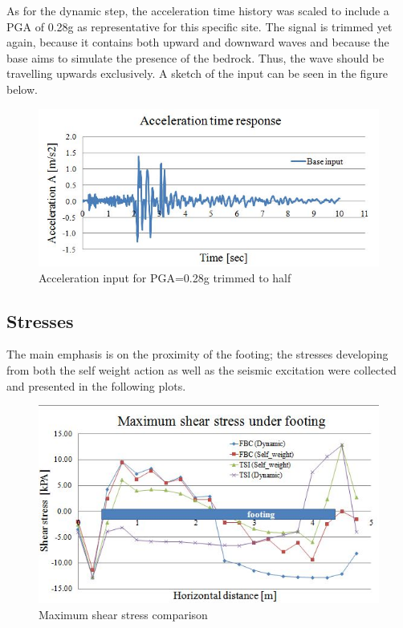 As for the dynamic step, the acceleration time history was scaled to include a PGA of 0.28g as representative for this specific site. The signal is trimmed yet again, because it contains both upward and downward waves and because the base aims to simulate the presence of the bedrock. Thus, the wave should be travelling upwards exclusively. A sketch of the input can be seen in the figure below.

		\begin{figure}[!h]
			\centering
			\includegraphics[width=0.9\linewidth]{"input_acc"}
			\caption{Acceleration input for PGA=0.28g trimmed to half}
			\label{inputacc}
		\end{figure}
		
\newpage
\subsection{Stresses}

The main emphasis is on the proximity of the footing; the stresses developing from both the self weight action as well as the seismic excitation were collected and presented in the following plots. 
\begin{figure}[!h]
	\centering
	\includegraphics[width=0.7\linewidth]{"shear stress"}
	\caption{Maximum shear stress comparison}
	\label{shearrr}
\end{figure}

